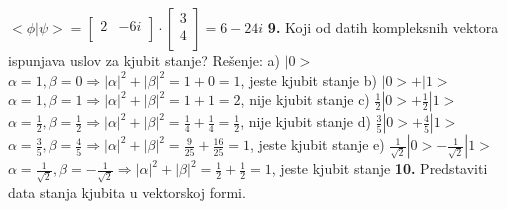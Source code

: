\documentclass{article}
\begin{document}
 $<\phi|\psi> = \begin{bmatrix}
     2 & -6i\\
 \end{bmatrix}\cdot\begin{bmatrix}
     3\\
     4\\
 \end{bmatrix} = 6 - 24i$ 
\vspace*{0.4cm}\newline
\textbf{9.} Koji od datih kompleksnih vektora ispunjava uslov za kjubit stanje?
\vspace*{0.4cm}\newline
Rešenje: \newline
a) $|0>$
\newline \hspace*{0.4cm}$\alpha = 1, \beta = 0 \Rightarrow |\alpha|^2 + |\beta|^2 = 1 + 0 = 1$, jeste kjubit stanje
\vspace{0.9cm}\newline
b) $|0> + |1>$
\newline \hspace*{0.4cm}$\alpha = 1, \beta = 1 \Rightarrow |\alpha|^2 + |\beta|^2 = 1 + 1 = 2$, nije kjubit stanje
\vspace{0.4cm}\newline
c) $\frac{1}{2}|0> + \frac{1}{2}|1>$
\newline \hspace*{0.4cm}$\alpha = \frac{1}{2}, \beta = \frac{1}{2} \Rightarrow |\alpha|^2 + |\beta|^2 = \frac{1}{4} + \frac{1}{4} = \frac{1}{2}$, nije kjubit stanje
\vspace{0.4cm}\newline
d) $\frac{3}{5}|0> + \frac{4}{5}|1>$
\newline \hspace*{0.4cm}$\alpha = \frac{3}{5}, \beta = \frac{4}{5} \Rightarrow |\alpha|^2 + |\beta|^2 = \frac{9}{25} + \frac{16}{25} = 1$, jeste kjubit stanje
\vspace{0.4cm}\newline
e) $\frac{1}{\sqrt{2}}|0> - \frac{1}{\sqrt{2}}|1>$
\newline \hspace*{0.4cm}$\alpha = \frac{1}{\sqrt{2}}, \beta = -\frac{1}{\sqrt{2}} \Rightarrow |\alpha|^2 + |\beta|^2 = \frac{1}{2} + \frac{1}{2} = 1$, jeste kjubit stanje
\vspace*{0.4cm}\newline
\textbf{10.} Predstaviti data stanja kjubita u vektorskoj formi.
\end{document}
